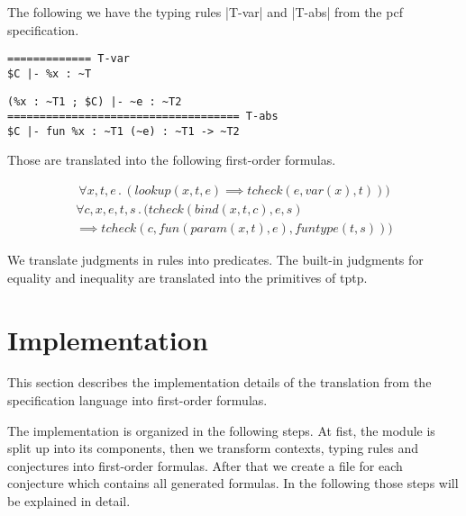 \begin{example}
  The following we have the typing rules \code|T-var| and \code|T-abs|
  from the \gls{pcf} specification.

\begin{minipage}{.30\linewidth}
\begin{lstlisting}[language=sltc]
%x : ~T in $C
============= T-var
$C |- %x : ~T
\end{lstlisting}
\end{minipage}
\begin{minipage}{.64\linewidth}
\begin{lstlisting}[language=sltc]
(%x : ~T1 ; $C) |- ~e : ~T2
==================================== T-abs
$C |- fun %x : ~T1 (~e) : ~T1 -> ~T2
\end{lstlisting}
\end{minipage}

Those are translated into the following first-order formulas.

\begin{multline}
  \forall x, t, e \,.\, (lookup(x, t, e) \implies tcheck(e, var(x), t)))
\end{multline}
\begin{multline}
  \forall c, x, e, t, s \,.\, (tcheck(bind(x, t, c), e, s) \\ \implies
  tcheck(c, fun(param(x, t), e), funtype(t, s)))
\end{multline}

\end{example}

We translate judgments in rules into predicates. The built-in
judgments for equality and inequality are translated into the
primitives of \gls{tptp}.
\section{Implementation}
\label{sec:implementation-fof}
This section describes the implementation details of the translation
from the specification language into first-order formulas.


The implementation is organized in the following steps. At fist, the
module is split up into its components, then we transform contexts,
typing rules and conjectures into first-order formulas. After that we
create a file for each conjecture which contains all generated
formulas. In the following those steps will be explained in detail.


